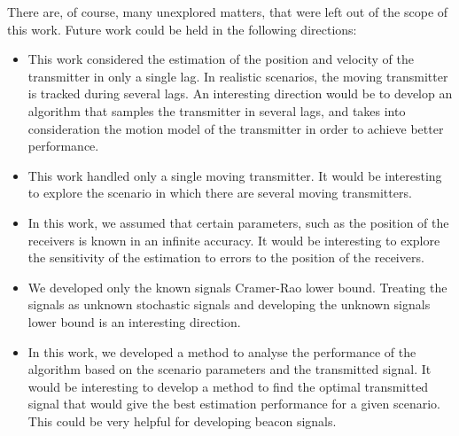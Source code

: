 There are, of course, many unexplored matters, that were left out of the scope of this work. Future work could be held in the following directions:
\begin{itemize}
\item This work considered the estimation of the position and velocity of the transmitter in only a single lag. In realistic scenarios, the moving transmitter is tracked during several lags. An interesting direction would be to develop an algorithm that samples the transmitter in several lags, and takes into consideration the motion model of the transmitter in order to achieve better performance.
\item This work handled only a single moving transmitter. It would be interesting to explore the scenario in which there are several moving transmitters.
\item In this work, we assumed that certain parameters, such as the position of the receivers is known in an infinite accuracy. It would be interesting to explore the sensitivity of the estimation to errors to the position of the receivers.
\item We developed only the known signals Cramer-Rao lower bound. Treating the signals as unknown stochastic signals and developing the unknown signals lower bound is an interesting direction.
\item In this work, we developed a method to analyse the performance of the algorithm based on the scenario parameters and the transmitted signal. It would be interesting to develop a method to find the optimal transmitted signal that would give the best estimation performance for a given scenario. This could be very helpful for developing beacon signals.
\end{itemize}
